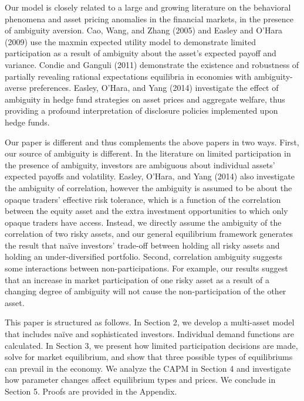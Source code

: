 \documentclass[10pt]{article}
\begin{document}
Our model is closely related to a large and growing literature on the behavioral phenomena and asset pricing anomalies in the financial markets, in the presence of ambiguity aversion. Cao, Wang, and Zhang (2005) and Easley and O'Hara (2009) use the maxmin expected utility model to demonstrate limited participation as a result of ambiguity about the asset's expected payoff and variance. Condie and Ganguli (2011) demonstrate the existence and robustness of partially revealing rational expectations equilibria in economies with ambiguity-averse preferences. Easley, O'Hara, and Yang (2014) investigate the effect of ambiguity in hedge fund strategies on asset prices and aggregate welfare, thus providing a profound interpretation of disclosure policies implemented upon hedge funds.

Our paper is different and thus complements the above papers in two ways. First, our source of ambiguity is different. In the literature on limited participation in the presence of ambiguity, investors are ambiguous about individual assets' expected payoffs and volatility. Easley, O'Hara, and Yang (2014) also investigate the ambiguity of correlation, however the ambiguity is assumed to be about the opaque traders' effective risk tolerance, which is a function of the correlation between the equity asset and the extra investment opportunities to which only opaque traders have access. Instead, we directly assume the ambiguity of the correlation of two risky assets, and our general equilibrium framework generates the result that na\"ive investors' trade-off between holding all risky assets and holding an under-diversified portfolio. Second, correlation ambiguity suggests some interactions between non-participations. For example, our results suggest that an increase in market participation of one risky asset as a result of a changing degree of ambiguity will not cause the non-participation of the other asset. 

This paper is structured as follows. In Section 2, we develop a multi-asset model that includes na\"ive and sophisticated investors. Individual demand functions are calculated. In Section 3, we present how limited participation decisions are made, solve for market equilibrium, and show that three possible types of equilibriums can prevail in the economy. We analyze the CAPM in Section 4 and investigate how parameter changes affect equilibrium types and prices. We conclude in Section 5. Proofs are provided in the Appendix.

\end{document}
